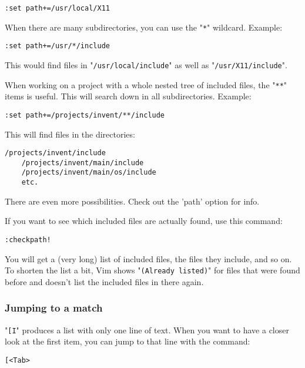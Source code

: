 \begin{Verbatim}[samepage=true]
 :set path+=/usr/local/X11
\end{Verbatim}

When there are many subdirectories, you can use the "\verb!*!" wildcard.
Example:

\begin{Verbatim}[samepage=true]
 :set path+=/usr/*/include
\end{Verbatim}

This would find files in "\verb!/usr/local/include!" as well as "\verb!/usr/X11/include!".

When working on a project with a whole nested tree of included files, the "\verb!**!" items is useful.
This will search down in all subdirectories.
Example:

\begin{Verbatim}[samepage=true]
 :set path+=/projects/invent/**/include
\end{Verbatim}

This will find files in the directories:

\begin{Verbatim}[samepage=true]
    /projects/invent/include 
    /projects/invent/main/include 
    /projects/invent/main/os/include 
    etc.
\end{Verbatim}

There are even more possibilities.
Check out the 'path' option for info.

If you want to see which included files are actually found, use this command:

\begin{Verbatim}[samepage=true]
 :checkpath!
\end{Verbatim}

You will get a (very long) list of included files, the files they include, and so on.
To shorten the list a bit, Vim shows "\verb!(Already listed)!" for files that were found before and doesn't list the included files in there again.

\subsubsection{Jumping to a match}
"\verb![I!" produces a list with only one line of text.
When you want to have a closer look at the first item, you can jump to that line with the command:

\begin{Verbatim}[samepage=true]
 [<Tab>
\end{Verbatim}

